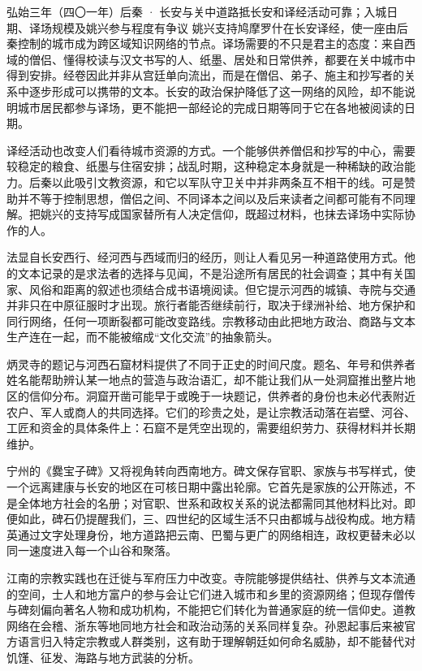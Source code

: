 \begin{event}{}{弘始三年（四〇一年）}{后秦 · 长安与关中道路}{抵长安和译经活动可靠；入城日期、译场规模及姚兴参与程度有争议}
姚兴支持鸠摩罗什在长安译经，使一座由后秦控制的城市成为跨区域知识网络的节点。译场需要的不只是君主的态度：来自西域的僧侣、懂得校读与汉文书写的人、纸墨、居处和日常供养，都要在关中城市中得到安排。经卷因此并非从宫廷单向流出，而是在僧侣、弟子、施主和抄写者的关系中逐步形成可以携带的文本。长安的政治保护降低了这一网络的风险，却不能说明城市居民都参与译场，更不能把一部经论的完成日期等同于它在各地被阅读的日期。

译经活动也改变人们看待城市资源的方式。一个能够供养僧侣和抄写的中心，需要较稳定的粮食、纸墨与住宿安排；战乱时期，这种稳定本身就是一种稀缺的政治能力。后秦以此吸引文教资源，和它以军队守卫关中并非两条互不相干的线。可是赞助并不等于控制思想，僧侣之间、不同译本之间以及后来读者之间都可能有不同理解。把姚兴的支持写成国家替所有人决定信仰，既超过材料，也抹去译场中实际协作的人。
\end{event}

法显自长安西行、经河西与西域而归的经历，则让人看见另一种道路使用方式。他的文本记录的是求法者的选择与见闻，不是沿途所有居民的社会调查；其中有关国家、风俗和距离的叙述也须结合成书语境阅读。但它提示河西的城镇、寺院与交通并非只在中原征服时才出现。旅行者能否继续前行，取决于绿洲补给、地方保护和同行网络，任何一项断裂都可能改变路线。宗教移动由此把地方政治、商路与文本生产连在一起，而不能被缩成“文化交流”的抽象箭头。

炳灵寺的题记与河西石窟材料提供了不同于正史的时间尺度。题名、年号和供养者姓名能帮助辨认某一地点的营造与政治语汇，却不能让我们从一处洞窟推出整片地区的信仰分布。洞窟开凿可能早于或晚于一块题记，供养者的身份也未必代表附近农户、军人或商人的共同选择。它们的珍贵之处，是让宗教活动落在岩壁、河谷、工匠和资金的具体条件上：石窟不是凭空出现的，需要组织劳力、获得材料并长期维护。

宁州的《爨宝子碑》又将视角转向西南地方。碑文保存官职、家族与书写样式，使一个远离建康与长安的地区在可核日期中露出轮廓。它首先是家族的公开陈述，不是全体地方社会的名册；对官职、世系和政权关系的说法都需同其他材料比对。即便如此，碑石仍提醒我们，三、四世纪的区域生活不只由都城与战役构成。地方精英通过文字处理身份，地方道路把云南、巴蜀与更广的网络相连，政权更替未必以同一速度进入每一个山谷和聚落。

江南的宗教实践也在迁徙与军府压力中改变。寺院能够提供结社、供养与文本流通的空间，士人和地方富户的参与会让它们进入城市和乡里的资源网络；但现存僧传与碑刻偏向著名人物和成功机构，不能把它们转化为普通家庭的统一信仰史。道教网络在会稽、浙东等地同地方社会和政治动荡的关系同样复杂。孙恩起事后来被官方语言归入特定宗教或人群类别，这有助于理解朝廷如何命名威胁，却不能替代对饥馑、征发、海路与地方武装的分析。

